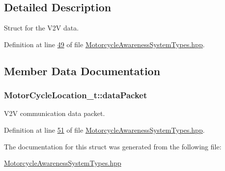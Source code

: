 \subsection{Detailed Description}
Struct for the V2\-V data. 

Definition at line \hyperlink{MotorcycleAwarenessSystemTypes_8hpp_source_l00049}{49} of file \hyperlink{MotorcycleAwarenessSystemTypes_8hpp_source}{Motorcycle\-Awareness\-System\-Types.\-hpp}.



\subsection{Member Data Documentation}
\hypertarget{structMotorCycleLocation__t_a1f854587b19dbe91dffd637ce70be62e}{
\subsubsection[{data\-Packet}]{ Motor\-Cycle\-Location\-\_\-t\-::data\-Packet}}\label{structMotorCycleLocation__t_a1f854587b19dbe91dffd637ce70be62e}


V2\-V communication data packet. 



Definition at line \hyperlink{MotorcycleAwarenessSystemTypes_8hpp_source_l00051}{51} of file \hyperlink{MotorcycleAwarenessSystemTypes_8hpp_source}{Motorcycle\-Awareness\-System\-Types.\-hpp}.



The documentation for this struct was generated from the following file\-:\begin{DoxyCompactItemize}
\item 
\hyperlink{MotorcycleAwarenessSystemTypes_8hpp}{Motorcycle\-Awareness\-System\-Types.\-hpp}\end{DoxyCompactItemize}
